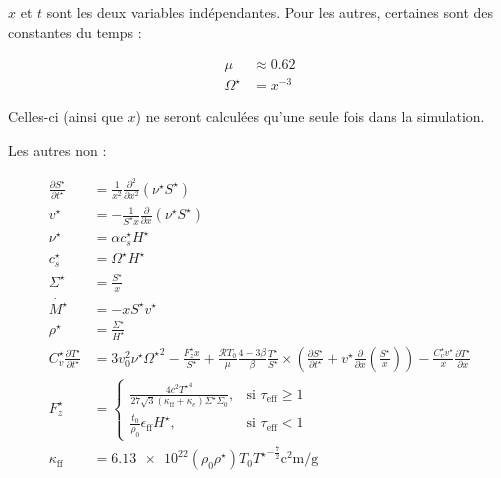 $x$ et $t$ sont les deux variables indépendantes. Pour les autres, certaines sont des constantes du temps :

\begin{subequations}
    \begin{align}
        \mu &\approx 0.62 \\
        \Omega^\star &= x^{-3}
    \end{align}
\end{subequations}

Celles-ci (ainsi que $x$) ne seront calculées qu’une seule fois dans la simulation.

Les autres non :

\begin{subequations}
    \begin{align}
        \frac{\partial S^\star}{\partial t^\star} &= \frac{1}{x^2} \frac{\partial^2}{\partial x^2} \left(\nu^\star S^\star\right) \label{eq:difS}\\
        v^\star &= - \frac{1}{S^\star x} \frac{\partial}{\partial x} \left(\nu^\star S^\star\right)\label{eq:difv} \\
        \nu^\star &= \alpha c_s^\star H^\star \\
        c_s^\star &= \Omega^\star H^\star \\
        \Sigma^\star &= \frac{S^\star}{x} \\
        \dot{M^\star} &= - x S^\star v^\star \label{eq:Mdotstar}\\
        \rho^\star &= \frac{\Sigma^\star}{H^\star} \\
        C_v^\star \frac{\partial T^{\star}}{\partial t^{\star}} &=
        3 v_0^2 \nu^\star {\Omega^\star}^2 - \frac{F_z^\star x}{S^\star} +
        \frac{\mathcal{R} T_0}{\mu} \frac{4-3\beta}{\beta} \frac{T^\star}{S^\star} \times
        \left( \frac{\partial S^\star}{\partial t^\star} + v^\star \frac{\partial}{\partial x} \left(\frac{S^\star}{x}\right) \right) -
        \frac{C_v^\star v^\star}{x} \frac{\partial T^\star}{\partial x}\label{eq:difT} \\
        F_z^\star &=
        \begin{cases}
            \frac{4 c^2 {T^\star}^4}{27 \sqrt{3} (\kappa_\mathrm{ff} + \kappa_e)\Sigma^\star \Sigma_0}, &\text{si $\tau_\mathrm{eff} \geq 1$} \\
            \frac{t_0}{\rho_0}\epsilon_\mathrm{ff} H^\star, &\text{si $\tau_\mathrm{eff} < 1$}
        \end{cases} \\
        \kappa_\mathrm{ff} &= \num{6.13e22} (\rho_0 \rho^\star) {T_0 T^\star}^{-\frac{7}{2}} \si{\square\centi\meter\per\gram} \\

\end{align}
\end{subequations}
